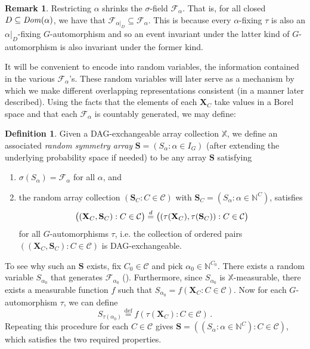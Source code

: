 \documentclass[10pt]{amsart}
\theoremstyle{definition}\newtheorem{defi}[theo]{Definition}\newtheorem{rema}[theo]{Remark}\newtheorem{exam}[theo]{Example}\newtheorem{exem}[theo]{Example}\newtheorem{nota}[theo]{Notation}
\newcommand{\alf}{\alpha}%
\newcommand*{\defeq}{\stackrel{\mathrm{def}}{=}}
\newcommand{\indices}[1]{\mathbb{N}^{#1}}
\renewcommand{\d}{\buildrel{d}\over{=}}
\newcommand*\dom{\mathit{Dom}}
\newcommand*\X{\mathbb{X}}
\newcommand*\N{\mathbb{N}}
\newcommand*\CC{{\mathcal{C}}}
\newcommand*\FF{\mathcal{F}}
\newcommand*\bS{\mathbf{S}}
\newcommand*\bX{\mathbf{X}}
\begin{document}
\begin{rema}
Restricting $\alf$ shrinks the $\sigma$-field $\mathcal{F}_\alf$. That is, for all closed $D\linebreak\subseteq \dom(\alf)$, we have that $\mathcal{F}_{\alf|_D} \subseteq \mathcal{F}_\alf$. This is because every $\alf$-fixing $\tau$ is also an $\alf|_D$-fixing $G$-automorphism and so an event invariant under the latter kind of $G$-automorphism is also invariant under the former kind.
\end{rema}


It will be convenient to encode into random variables, the information contained in the various $\FF_\alf$'s. These random variables will later serve as a mechanism by which we make different overlapping representations consistent (in a manner later described). Using the facts that the elements of each $\bX_C$ take values in a Borel space and that each $\FF_\alf $ is countably generated, we may define:

\begin{defi}
Given a DAG-exchangeable array collection $\X$, we define an associated \emph{random symmetry array} $\bS =(S_\alf : \alf \in I_G)$ (after extending the underlying probability space if needed) to be any array $\bS$ satisfying
\begin{enumerate}
\item $\sigma(S_\alf)=\mathcal{F}_\alf $ for all $\alf$, and
\item the random array collection $(\bS_C : C \in \CC)$ with $\bS_C = (S_\alf : \alf \in \indices C)$, satisfies
\[
\big((\bX_C,\bS_C) : C \in \CC\big) \d \big((\tau(\bX_C),\tau(\bS_C)) : C \in \CC\big)
\]
for all $G$-automorphisms $\tau$, i.e. the collection of ordered pairs $((\bX_C,\bS_C) : C \in \CC)$ is DAG-exchangeable.
\end{enumerate}
\end{defi}

To see why such an $\bS$ exists, fix $C_0 \in \CC$ and pick $\alpha_0 \in \N^{C_0}$. There exists a random variable $S_{\alpha_0}$ that generates $\mathcal{F}_{\alf_0}$ (\cite[Chapter 3, Exercice~13]{resnick2013probability}). Furthermore, since $S_{\alpha_0}$ is $\X$-measurable, there exists a measurable function $f$ such that $S_{\alpha_0} = f(\bX_C: C \in \CC)$. Now for each $G$-automorphism $\tau$, we can define
\[
S_{\tau(\alpha_0)}
\defeq f(\tau(\bX_C): C \in \CC)\,.
\]
Repeating this procedure for each $C \in \CC$ gives $\bS = ((S_\alf : \alf \in \indices C) : C \in \CC)$, which satisfies the two required properties.
\end{document}

